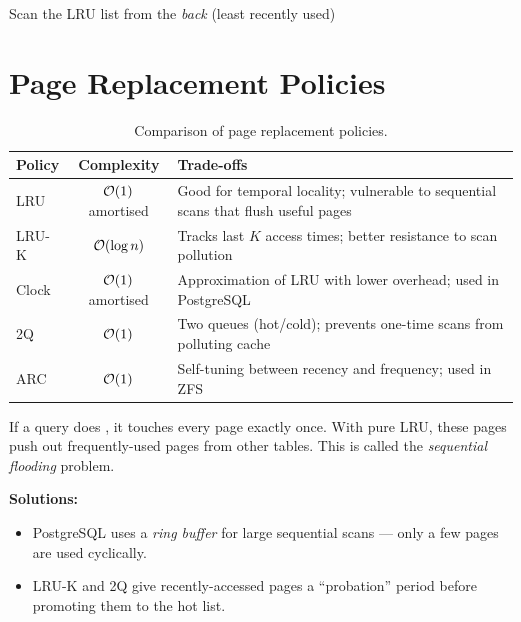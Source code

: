 \begin{algorithm}[H]
\caption{LRU Eviction}
\label{alg:lru-eviction}
Scan the LRU list from the \emph{back} (least recently used)\;
\end{algorithm}

\section{Page Replacement Policies}

\begin{table}[H]
\centering
\caption{Comparison of page replacement policies.}
\begin{tabular}{l c p{8cm}}
\toprule
\textbf{Policy} & \textbf{Complexity} & \textbf{Trade-offs} \\
\midrule
LRU              & $\mathcal{O}(1)$ amortised & Good for temporal locality; vulnerable to sequential scans that flush useful pages \\
LRU-K            & $\mathcal{O}(\log n)$      & Tracks last $K$ access times; better resistance to scan pollution \\
Clock            & $\mathcal{O}(1)$ amortised & Approximation of LRU with lower overhead; used in PostgreSQL \\
2Q               & $\mathcal{O}(1)$           & Two queues (hot/cold); prevents one-time scans from polluting cache \\
ARC              & $\mathcal{O}(1)$           & Self-tuning between recency and frequency; used in ZFS \\
\bottomrule
\end{tabular}
\end{table}

\begin{deepdivebox}
If a query does , it touches every page exactly once.  With pure LRU, these pages push out frequently-used pages from other tables.  This is called the \emph{sequential flooding} problem.

\textbf{Solutions:}
\begin{itemize}[nosep]
  \item PostgreSQL uses a \emph{ring buffer} for large sequential scans --- only a few pages are used cyclically.
  \item LRU-K and 2Q give recently-accessed pages a ``probation'' period before promoting them to the hot list.
\end{itemize}
\end{deepdivebox}

